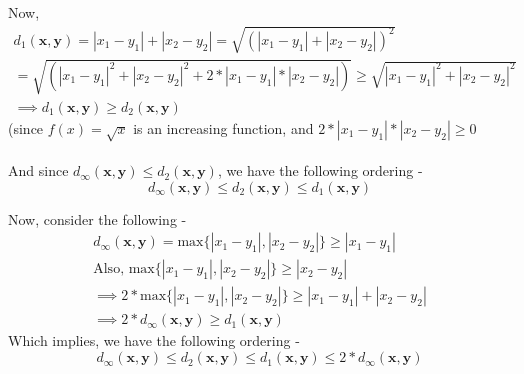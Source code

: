 \begin{frame}
    Now,
    \begin{gather*}
        d_1(\boldsymbol{x}, \boldsymbol{y}) = |x_1 - y_1| + |x_2 - y_2| = \sqrt{\left(|x_1 - y_1| + |x_2 - y_2|\right)^2} \\
        = \sqrt{\left(|x_1 - y_1|^2 + |x_2 - y_2|^2 + 2*|x_1 - y_1|*|x_2 - y_2|\right)} \geq \sqrt{|x_1 - y_1|^2 + |x_2 - y_2|^2} \\
        \implies d_1(\boldsymbol{x}, \boldsymbol{y}) \geq d_2(\boldsymbol{x}, \boldsymbol{y})
    \end{gather*}
    (since \( f(x) = \sqrt{x} \) is an increasing function, and \( 2*|x_1 - y_1|*|x_2 - y_2| \geq 0 \) \\\\
    And since \(d_\infty(\boldsymbol{x}, \boldsymbol{y}) \leq d_2(\boldsymbol{x}, \boldsymbol{y})\), we have the following ordering -
    \begin{equation*}
        d_\infty(\boldsymbol{x}, \boldsymbol{y}) \leq d_2(\boldsymbol{x}, \boldsymbol{y}) \leq d_1(\boldsymbol{x}, \boldsymbol{y})
    \end{equation*}
\end{frame}

\begin{frame}
    Now, consider the following - 
    \begin{gather*}
        d_\infty(\boldsymbol{x}, \boldsymbol{y}) = \text{max} \{|x_1 - y_1|, |x_2 - y_2|\} \geq |x_1 - y_1| \\
        \text{Also, } \text{max} \{|x_1 - y_1|, |x_2 - y_2|\} \geq |x_2 - y_2| \\
        \implies 2*\text{max} \{|x_1 - y_1|, |x_2 - y_2|\} \geq |x_1 - y_1| + |x_2 - y_2| \\
        \implies 2*d_\infty(\boldsymbol{x}, \boldsymbol{y}) \geq d_1(\boldsymbol{x}, \boldsymbol{y})
    \end{gather*}
    Which implies, we have the following ordering -
    \begin{equation*}
        d_\infty(\boldsymbol{x}, \boldsymbol{y}) \leq d_2(\boldsymbol{x}, \boldsymbol{y}) \leq d_1(\boldsymbol{x}, \boldsymbol{y}) \leq 2*d_\infty(\boldsymbol{x}, \boldsymbol{y})
    \end{equation*}
\end{frame}

